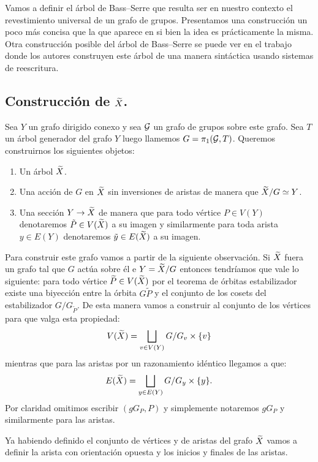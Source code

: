 \documentclass[tesis.tex]{subfiles}
\begin{document}
Vamos a definir el árbol de Bass--Serre que resulta ser en nuestro contexto el revestimiento universal de un grafo de grupos.
Presentamos una construcción un poco más concisa que la que aparece en \cite{serre2002trees} si bien la idea es prácticamente la misma.
Otra construcción posible del árbol de Bass--Serre se puede ver en el trabajo \cite{diekert2017context} donde los autores construyen este árbol de una manera sintáctica usando sistemas de reescritura.

\subsection{Construcción de $\widetilde X$.}

Sea  $Y$ un grafo dirigido conexo y sea ${\cal G}$ un grafo de grupos sobre este grafo.
Sea $T$ un árbol generador del grafo $Y$ luego llamemos $G = \pi_1({\cal G},T)$.
Queremos construirnos los siguientes objetos:

\begin{enumerate}[]
	\item Un árbol $\widetilde X$.
	\item Una acción de $G$ en $\widetilde X$ sin inversiones de aristas de manera que $\widetilde X / G \simeq Y$.
	\item Una sección $Y \to \widetilde X$ de manera que para todo vértice $P \in V(Y)$ denotaremos $\tilde P \in V(\widetilde X)$ a su imagen y similarmente para toda arista $y \in E(Y)$ denotaremos $\tilde y \in E(\widetilde X)$ a su imagen.
\end{enumerate}

Para construir este grafo vamos a partir de la siguiente observación.
Si $\widetilde X$ fuera un grafo tal que $G$ actúa sobre él e 
$Y = \widetilde X / G$ entonces tendríamos que vale lo siguiente:
para todo vértice $\widetilde{ P} \in V(\widetilde X)$ por el teorema de órbitas estabilizador existe una biyección entre la órbita $G \widetilde{P} $ y el conjunto de los cosets del estabilizador $G / G_{\widetilde P}$.
De esta manera vamos a construir al conjunto de los vértices para que valga esta propiedad:
\[
V(\widetilde X) = \bigsqcup_{v \in V(Y)} G/G_{v} \times \{v\}
\]
mientras que para las aristas por un razonamiento idéntico llegamos a que: 
\[
E(\widetilde X) = \bigsqcup_{y \in E(Y)} G/G_{y} \times \{y\}.
\]
Por claridad omitimos escribir $(gG_{P}, P)$ y simplemente notaremos $gG_{P}$ y similarmente para las aristas.

Ya habiendo definido el conjunto de vértices y de aristas del grafo $\widetilde X$
vamos a definir la arista con orientación opuesta y los inicios y finales de las aristas.
\end{document}
